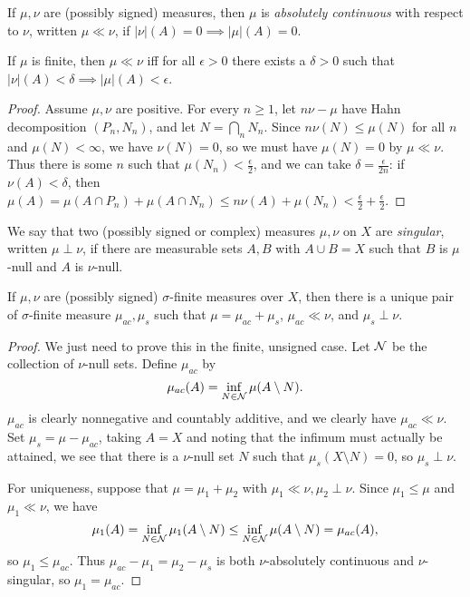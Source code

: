 \documentclass[letterpaper,11pt]{report}
\begin{document}
\begin{defn} If $\mu, \nu$ are (possibly signed) measures, then $\mu$ is \emph{absolutely continuous} with respect to $\nu$, written $\mu \ll \nu$, if $|\nu|(A) = 0 \implies |\mu|(A) = 0$.
\end{defn}

\begin{prop}\label{absolutely-continuous} If $\mu$ is finite, then $\mu \ll \nu$ iff for all $\epsilon > 0$ there exists a $\delta > 0$ such that $|\nu|(A) < \delta \implies |\mu|(A) < \epsilon$.
\end{prop}
\begin{proof} Assume $\mu, \nu$ are positive. For every $n \ge 1$, let $n\nu - \mu$ have Hahn decomposition $(P_n,N_n)$, and let $N = \bigcap_n N_n$. Since $n\nu(N) \le \mu(N)$ for all $n$ and $\mu(N) < \infty$, we have $\nu(N) = 0$, so we must have $\mu(N) = 0$ by $\mu \ll \nu$. Thus there is some $n$ such that $\mu(N_n) < \frac{\epsilon}{2}$, and we can take $\delta = \frac{\epsilon}{2n}$: if $\nu(A) < \delta$, then $\mu(A) = \mu(A\cap P_n) + \mu(A\cap N_n) \le n\nu(A) + \mu(N_n) < \frac{\epsilon}{2} + \frac{\epsilon}{2}$.
\end{proof}

\begin{defn} We say that two (possibly signed or complex) measures $\mu,\nu$ on $X$ are \emph{singular}, written $\mu \perp \nu$, if there are measurable sets $A,B$ with $A \cup B = X$ such that $B$ is $\mu$-null and $A$ is $\nu$-null.
\end{defn}

\begin{thm}\label{lebesgue-decomposition} If $\mu, \nu$ are (possibly signed) $\sigma$-finite measures over $X$, then there is a unique pair of $\sigma$-finite measure $\mu_{ac}, \mu_s$ such that $\mu = \mu_{ac} + \mu_s$, $\mu_{ac} \ll \nu$, and $\mu_s \perp \nu$.
\end{thm}
\begin{proof} We just need to prove this in the finite, unsigned case. Let $\mathcal{N}$ be the collection of $\nu$-null sets. Define $\mu_{ac}$ by
\[
\mu_{ac}(A) = \inf_{N \in \mathcal{N}} \mu(A\setminus N).
\]
$\mu_{ac}$ is clearly nonnegative and countably additive, and we clearly have $\mu_{ac} \ll \nu$. Set $\mu_s = \mu - \mu_{ac}$, taking $A = X$ and noting that the infimum must actually be attained, we see that there is a $\nu$-null set $N$ such that $\mu_s(X\setminus N) = 0$, so $\mu_s \perp \nu$.

For uniqueness, suppose that $\mu = \mu_1 + \mu_2$ with $\mu_1 \ll \nu, \mu_2 \perp \nu$. Since $\mu_1 \le \mu$ and $\mu_1 \ll \nu$, we have
\[
\mu_1(A) = \inf_{N \in \mathcal{N}} \mu_1(A\setminus N) \le \inf_{N \in \mathcal{N}} \mu(A\setminus N) = \mu_{ac}(A),
\]
so $\mu_1 \le \mu_{ac}$. Thus $\mu_{ac} - \mu_1 = \mu_2 - \mu_s$ is both $\nu$-absolutely continuous and $\nu$-singular, so $\mu_1 = \mu_{ac}$.
\end{proof}
\end{document}
